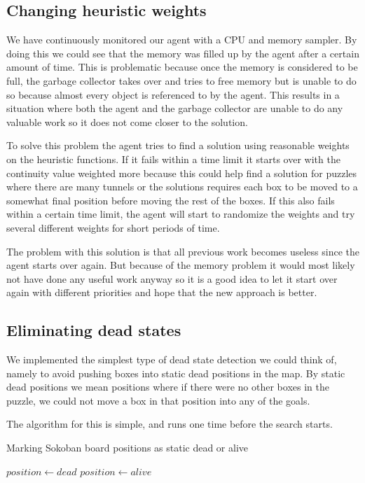 \documentclass[a4paper,11pt]{article}
\begin{document}
\subsection{Changing heuristic weights}
We have continuously monitored our agent with a CPU and memory sampler.
By doing this we could see that the memory was filled up by the agent after a certain amount of time. 
This is problematic because once the memory is considered to be full,
the garbage collector takes over and tries to free
memory but is unable to do so because almost every object is referenced to by the agent. 
This results in a situation where both the agent and the garbage 
collector are unable to do any valuable work so it does not come closer to the solution. 

To solve this problem the agent tries to find a solution using reasonable weights on the heuristic functions.
If it fails within a time limit it starts over with the continuity value weighted more because this could help 
find a solution for puzzles where there are many tunnels or the solutions requires each box to be moved to
a somewhat final position before moving the rest of the boxes.
If this also fails within a certain time limit, the agent will start to randomize 
the weights and try several different weights for short periods of time.

The problem with this solution is that all previous work becomes useless since the agent starts over again.
But because of the memory problem it would most likely not have done any useful work anyway so
it is a good idea to let it start over again with different priorities
and hope that the new approach is better.

\subsection{Eliminating dead states}

\label{sec:dead}

We implemented the simplest type of dead state detection we could think of,
namely to avoid pushing boxes into static dead positions in the map.
By static dead positions we mean positions where if there were no other boxes in the puzzle,
we could not move a box in that position into any of the goals.

The algorithm for this is simple, and runs one time before the search starts.

\clearpage
\begin{algorithm}
\caption{Marking Sokoban board positions as static dead or alive}
\label{alg:dead_positions}
\begin{algorithmic}
			\State $position \gets dead$
		\EndFor
					\State $position \gets alive$
				\EndIf
			\EndFor
		\EndFor
	\EndFunction
\end{algorithmic}
\end{algorithm}
\end{document}
